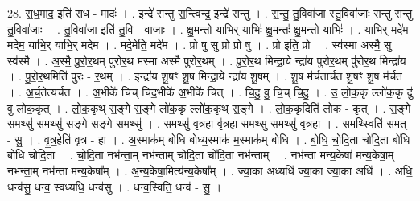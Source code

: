 \documentclass[17pt]{extarticle}
\begin{document}
28. स॒ध॒माद॒ इति॑ सध - मादः॑ । . इन्द्रे॑ सन्तु स॒न्त्विन्द्र॒ इन्द्रे॑ सन्तु । . स॒न्तु॒ तु॒विवा॑जा स्तु॒विवा॑जाः सन्तु सन्तु तु॒विवा॑जाः । . तु॒विवा॑जा॒ इति॑ तु॒वि - वा॒जाः॒ । . क्षु॒मन्तो॒ याभि॒र् याभिः॑ क्षु॒मन्तः॑ क्षु॒मन्तो॒ याभिः॑ । . याभि॒र् मदे॑म॒ मदे॑म॒ याभि॒र् याभि॒र् मदे॑म । . मदे॒मेति॒ मदे॑म । . प्रो षु सु प्रो प्रो षु । . प्रो इति॒ प्रो । . स्व॑स्मा अस्मै॒ सु स्व॑स्मै । . अ॒स्मै॒ पु॒रो॒र॒थम् पु॑रोर॒थ म॑स्मा अस्मै पुरोर॒थम् । . पु॒रो॒र॒थ मिन्द्रा॒ये न्द्रा॑य पुरोर॒थम् पु॑रोर॒थ मिन्द्रा॑य । . पु॒रो॒र॒थमिति॑ पुरः - र॒थम् । . इन्द्रा॑य शू॒षꣳ शू॒ष मिन्द्रा॒ये न्द्रा॑य शू॒षम् । . शू॒ष म॑र्चतार्चत शू॒षꣳ शू॒ष म॑र्चत । . अ॒र्च॒तेत्य॑र्चत । . अ॒भीके॑ चिच् चिद॒भीके॑ अ॒भीके॑ चित् । . चि॒दु॒ वु॒ चि॒च् चि॒दु॒ । . उ॒ लो॒क॒कृ ल्लो॑क॒कृ दु॑ वु लोक॒कृत् । . लो॒क॒कृथ् स॒ङ्गे स॒ङ्गे लो॑क॒कृ ल्लो॑क॒कृथ् स॒ङ्गे । . लो॒क॒कृदिति॑ लोक - कृत् । . स॒ङ्गे स॒मथ्सु॑ स॒मथ्सु॑ स॒ङ्गे स॒ङ्गे स॒मथ्सु॑ । . स॒मथ्सु॑ वृत्र॒हा वृ॑त्र॒हा स॒मथ्सु॑ स॒मथ्सु॑ वृत्र॒हा । . स॒मथ्स्विति॑ स॒मत् - सु॒ । . वृ॒त्र॒हेति॑ वृत्र - हा । . अ॒स्माक॑म् बोधि बोध्य॒स्माक॑ म॒स्माक॑म् बोधि । . बो॒धि॒ चो॒दि॒ता चो॑दि॒ता बो॑धि बोधि चोदि॒ता । . चो॒दि॒ता नभ॑न्ता॒म् नभ॑न्ताम् चोदि॒ता चो॑दि॒ता नभ॑न्ताम् । . नभ॑न्ता मन्य॒केषा॑ मन्य॒केषा॒म् नभ॑न्ता॒म् नभ॑न्ता मन्य॒केषा᳚म् । . अ॒न्य॒केषा॒मित्य॑न्य॒केषा᳚म् । . ज्या॒का अध्यधि॑ ज्या॒का ज्या॒का अधि॑ । . अधि॒ धन्व॑सु॒ धन्व॒ स्वध्यधि॒ धन्व॑सु । . धन्व॒स्विति॒ धन्व॑ - सु॒ । \newline
\end{document}
